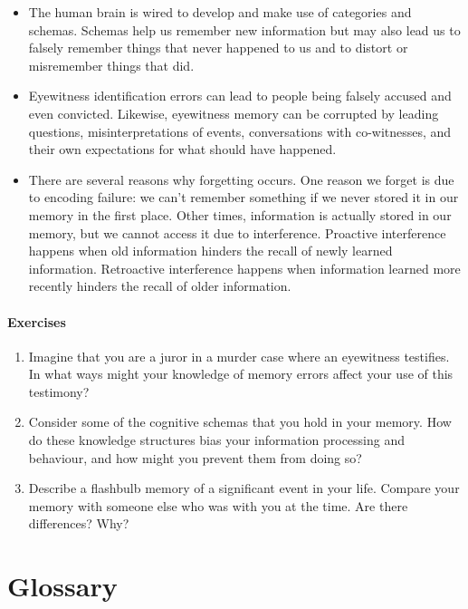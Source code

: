 \documentclass[
]{krantz}
\providecommand{\tightlist}{%
  \setlength{\itemsep}{0pt}\setlength{\parskip}{0pt}}
\begin{document}
\begin{itemize}
\tightlist
\item
  The human brain is wired to develop and make use of categories and schemas. Schemas help us remember new information but may also lead us to falsely remember things that never happened to us and to distort or misremember things that did.
\item
  Eyewitness identification errors can lead to people being falsely accused and even convicted. Likewise, eyewitness memory can be corrupted by leading questions, misinterpretations of events, conversations with co-witnesses, and their own expectations for what should have happened.
\item
  There are several reasons why forgetting occurs. One reason we forget is due to encoding failure: we can't remember something if we never stored it in our memory in the first place. Other times, information is actually stored in our memory, but we cannot access it due to interference. Proactive interference happens when old information hinders the recall of newly learned information. Retroactive interference happens when information learned more recently hinders the recall of older information.
\end{itemize}

\paragraph*{Exercises}\label{exercises-5}

\begin{enumerate}
\def\labelenumi{\arabic{enumi}.}
\tightlist
\item
  Imagine that you are a juror in a murder case where an eyewitness testifies. In what ways might your knowledge of memory errors affect your use of this testimony?
\item
  Consider some of the cognitive schemas that you hold in your memory. How do these knowledge structures bias your information processing and behaviour, and how might you prevent them from doing so?
\item
  Describe a flashbulb memory of a significant event in your life. Compare your memory with someone else who was with you at the time. Are there differences? Why?
\end{enumerate}

\section{Glossary}\label{glossary-5}
\end{document}
